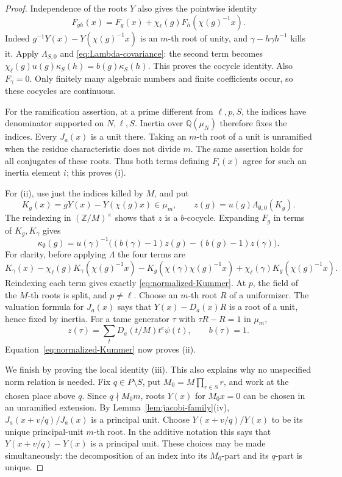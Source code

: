 \documentclass[11pt,a4paper]{article}
\theoremstyle{definition}
\newcommand{\Q}{\mathbb Q}
\newcommand{\Z}{\mathbb Z}
\begin{document}
\begin{proof}
Independence of the roots \(Y\) also gives the pointwise identity
\[
 F_{gh}(x)=F_g(x)+\chi_\ell(g)F_h(\chi(g)^{-1}x).
\]
Indeed \(g^{-1}Y(x)-Y(\chi(g)^{-1}x)\) is an \(m\)-th root
of unity, and \(\gamma-h\gamma h^{-1}\) kills it.
Apply \(\Lambda_{S,0}\) and
\eqref{eq:Lambda-covariance}: the second term becomes
\(\chi_\ell(g)u(g)\kappa_S(h)=b(g)\kappa_S(h)\).
This proves the cocycle identity.
Also \(F_\gamma=0\).
Only finitely many algebraic numbers and finite coefficients occur,
so these cocycles are continuous.

For the ramification assertion, at a prime different from
\(\ell,p,S\), the indices have denominator supported on \(N,\ell,S\).
Inertia over \(\Q(\mu_N)\) therefore fixes the indices.
Every \(J_a(x)\) is a unit there.
Taking an \(m\)-th root of a unit is unramified when the residue
characteristic does not divide \(m\).
The same assertion holds for all conjugates of these roots.
Thus both terms defining \(F_i(x)\) agree for such an inertia element \(i\);
this proves (i).

For (ii), use just the indices killed by \(M\), and put
\[
 K_g(x)=gY(x)-Y(\chi(g)x)\in\mu_m,\qquad
 z(g)=u(g)\Lambda_{\emptyset,0}(K_g).
\]
The reindexing in \((\Z/M)^\times\) shows that \(z\) is a
\(b\)-cocycle. Expanding \(F_g\) in terms of \(K_g,K_\gamma\) gives
\begin{equation}\label{eq:normalized-Kummer}
 \kappa_\emptyset(g)=u(\gamma)^{-1}
 \bigl((b(\gamma)-1)z(g)-(b(g)-1)z(\gamma)\bigr).
\end{equation}
For clarity, before applying \(\Lambda\) the four terms are
\[
 K_\gamma(x)-\chi_\ell(g)K_\gamma(\chi(g)^{-1}x)
 -K_g(\chi(\gamma)\chi(g)^{-1}x)
 +\chi_\ell(\gamma)K_g(\chi(g)^{-1}x).
\]
Reindexing each term gives exactly
\eqref{eq:normalized-Kummer}.
At \(p\), the field of the \(M\)-th roots is split,
and \(p\ne\ell\).
Choose an \(m\)-th root \(R\) of a uniformizer.
The valuation formula for \(J_a(x)\) says that
\(Y(x)-D_a(x)R\) is a root of a unit,
hence fixed by inertia.
For a tame generator \(\tau\) with \(\tau R-R=1\) in \(\mu_m\),
\[
 z(\tau)=\sum_tD_a(t/M)t^e\psi(t),\qquad b(\tau)=1.
\]
Equation~\eqref{eq:normalized-Kummer} now proves (ii).

We finish by proving the local identity (iii).
This also explains why no unspecified norm relation is needed.
Fix \(q\in P\setminus S\), put \(M_0=M\prod_{r\in S}r\),
and work at the chosen place above \(q\).
Since \(q\nmid M_0m\), roots \(Y(x)\) for \(M_0x=0\)
can be chosen in an unramified extension.
By Lemma~\ref{lem:jacobi-family}(iv),
\(J_a(x+v/q)/J_a(x)\) is a principal unit.
Choose \(Y(x+v/q)/Y(x)\) to be its unique principal-unit
\(m\)-th root.
In the additive notation this says that \(Y(x+v/q)-Y(x)\)
is a principal unit.
These choices may be made simultaneously: the decomposition of an index
into its \(M_0\)-part and its \(q\)-part is unique.


\end{proof}
\end{document}
